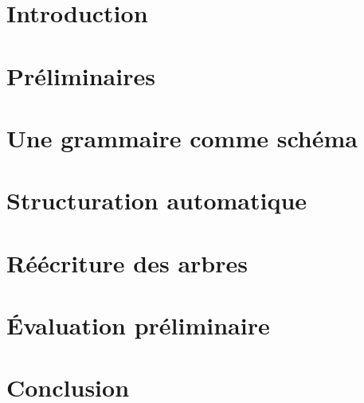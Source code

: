 \section{Introduction}


\section{Préliminaires}


\section{Une grammaire comme schéma}
\label{sec:struct:meta}


\pagebreak
\section{Structuration automatique}


\section{Réécriture des arbres}


\section{Évaluation préliminaire}


\section{Conclusion}

